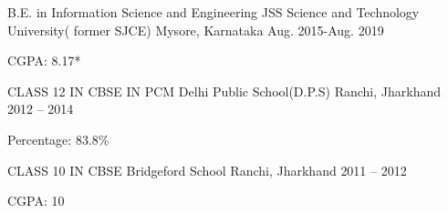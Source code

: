 

\begin{cventries}

  \cventry
    {B.E. in Information Science and Engineering} %
    {JSS Science and Technology University( former SJCE)} %
    {Mysore, Karnataka} %
    {Aug. 2015-Aug. 2019} %
    {
      \begin{cvitems} %
        \item {CGPA: 8.17*}
      \end{cvitems}
    }
    
    \cventry
    {CLASS 12 IN CBSE IN PCM} %
    {Delhi Public School(D.P.S)} %
    {Ranchi, Jharkhand} %
    {2012 – 2014} %
    {
      \begin{cvitems} %
        \item {Percentage: 83.8\%}
      \end{cvitems}
    }
    
    \cventry
    {CLASS 10 IN CBSE} %
    {Bridgeford School} %
    {Ranchi, Jharkhand} %
    {2011 – 2012} %
    {
      \begin{cvitems} %
        \item {CGPA: 10}
      \end{cvitems}
    }

\end{cventries}
